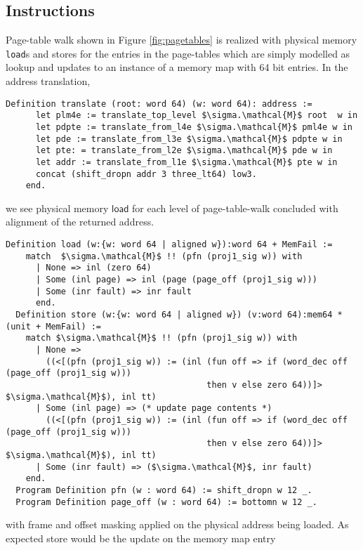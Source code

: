 \subsection{Instructions}
\label{sec:instructions}
Page-table walk shown in Figure \ref{fig:pagetables} is realized with physical memory \texttt{load}s and \textsf{store}s for the entries in the page-tables which are simply modelled as lookup and updates to an instance of a memory map with 64 bit entries. In the address translation,
\begin{lstlisting}[language=Coq]
 Definition translate (root: word 64) (w: word 64): address :=
      let plm4e := translate_top_level $\sigma.\mathcal{M}$ root  w in
      let pdpte := translate_from_l4e $\sigma.\mathcal{M}$ pml4e w in 
      let pde := translate_from_l3e $\sigma.\mathcal{M}$ pdpte w in
      let pte: = translate_from_l2e $\sigma.\mathcal{M}$ pde w in
      let addr := translate_from_l1e $\sigma.\mathcal{M}$ pte w in
      concat (shift_dropn addr 3 three_lt64) low3.
    end.
\end{lstlisting}
we see physical memory $\mathsf{load}$ for each level of page-table-walk concluded with alignment of the returned address.
\begin{lstlisting}[language=Coq]
   Definition load (w:{w: word 64 | aligned w}):word 64 + MemFail :=
    match  $\sigma.\mathcal{M}$ !! (pfn (proj1_sig w)) with
      | None => inl (zero 64)
      | Some (inl page) => inl (page (page_off (proj1_sig w)))
      | Some (inr fault) => inr fault
      end.
  Definition store (w:{w: word 64 | aligned w}) (v:word 64):mem64 * (unit + MemFail) :=
    match $\sigma.\mathcal{M}$ !! (pfn (proj1_sig w)) with
      | None =>
        ((<[(pfn (proj1_sig w)) := (inl (fun off => if (word_dec off (page_off (proj1_sig w)))
                                        then v else zero 64))]> $\sigma.\mathcal{M}$), inl tt)
      | Some (inl page) => (* update page contents *)
        ((<[(pfn (proj1_sig w)) := (inl (fun off => if (word_dec off (page_off (proj1_sig w)))
                                        then v else zero 64))]> $\sigma.\mathcal{M}$), inl tt)
      | Some (inr fault) => ($\sigma.\mathcal{M}$, inr fault)
    end.
  Program Definition pfn (w : word 64) := shift_dropn w 12 _.
  Program Definition page_off (w : word 64) := bottomn w 12 _.
\end{lstlisting}
with frame and offset masking applied on the physical address being loaded. As expected \textsf{store} would be the update on the memory map entry
